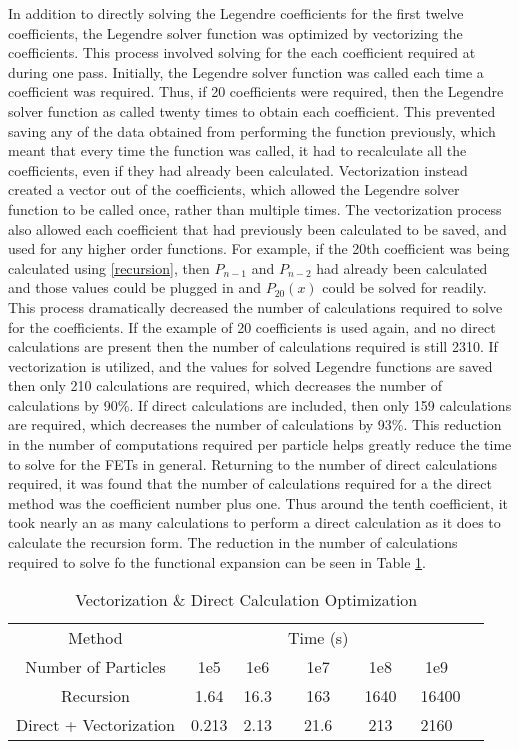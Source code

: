 \documentclass[10tma4paper]{article}
\begin{document}
In addition to directly solving the Legendre coefficients for the first twelve coefficients, the Legendre solver function was optimized by vectorizing the coefficients. This process involved solving for the each coefficient required at during one pass. Initially, the Legendre solver function was called each time a coefficient was required. Thus, if 20 coefficients were required, then the Legendre solver function as called twenty times to obtain each coefficient. This prevented saving any of the data obtained from performing the function previously, which meant that every time the function was called, it had to recalculate all the coefficients, even if they had already been calculated. Vectorization instead created a vector out of the coefficients, which allowed the Legendre solver function to be called once, rather than multiple times. The vectorization process also allowed each coefficient that had previously been calculated to be saved, and used for any higher order functions. For example, if the 20th coefficient was being calculated using \eqref{recursion}, then $P_{n-1}$ and $P_{n-2}$ had already been calculated and those values could be plugged in and $P_{20}(x)$ could be solved for readily. This process dramatically decreased the number of calculations required to solve for the coefficients. If the example of 20 coefficients is used again, and no direct calculations are present then the number of calculations required is still 2310. If vectorization is utilized, and the values for solved Legendre functions are saved then only 210 calculations are required, which decreases the number of calculations by 90\%. If direct calculations are included, then only 159 calculations are required, which decreases the number of calculations by 93\%. This reduction in the number of computations required per particle helps greatly reduce the time to solve for the FETs in general. Returning to the number of direct calculations required, it was found that the number of calculations required for a the direct method was the coefficient number plus one. Thus around the tenth coefficient, it took nearly an as many calculations to perform a direct calculation as it does to calculate the recursion form. The reduction in the number of calculations required to solve fo the functional expansion can be seen in Table \ref{table:vect op}.

\begin{table}[htbp!]
	\caption{Vectorization \& Direct Calculation Optimization}
	\centering
	\begin{tabular}{c c c c c c c }
		\hline
		Method & & & Time (s) & & & \\[0.5ex]
		Number of Particles& 1e5 & 1e6 & 1e7 & 1e8 & 1e9 &\\
		\hline		
		\hline
		Recursion & 1.64 & 16.3 & 163 & 1640 & ~16400 & \\
		Direct + Vectorization & 0.213 & 2.13 & 21.6 & 213 & 2160 & \\[1ex]
		\hline
	\end{tabular}
	\label{table:vect op}
\end{table}
\end{document}
